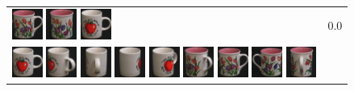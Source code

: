 \begin{figure}[tbp]
\begin{center}
\begin{tabular}{m{11cm} | m{3cm} |}
\includegraphics[width=1cm]{coil/beeld-6.eps}
\includegraphics[width=1cm]{coil/beeld-8.eps}
\includegraphics[width=1cm]{coil/beeld-36.eps}
& {\scriptsize 0.0}
\\
\includegraphics[width=1cm]{coil/beeld-36.eps}
\includegraphics[width=1cm]{coil/beeld-40.eps}
\includegraphics[width=1cm]{coil/beeld-41.eps}
\includegraphics[width=1cm]{coil/beeld-38.eps}
\includegraphics[width=1cm]{coil/beeld-39.eps}
\includegraphics[width=1cm]{coil/beeld-10.eps}
\includegraphics[width=1cm]{coil/beeld-6.eps}
\includegraphics[width=1cm]{coil/beeld-7.eps}
\includegraphics[width=1cm]{coil/beeld-11.eps}

\end{tabular}
\end{center}
\end{figure}
